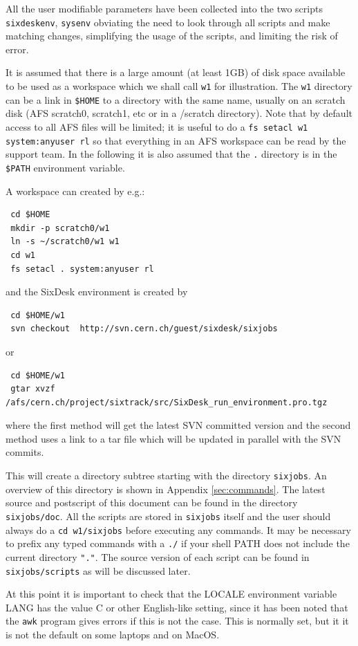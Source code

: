 \documentclass{cernatsnote}
\begin{document}
All the user modifiable parameters have been collected into the two scripts
{\tt sixdeskenv}, {\tt sysenv} obviating the need to look through all scripts
and make matching changes, simplifying the usage of the scripts, and limiting
the risk of error.

It is assumed that there is a large amount (at least 1GB) of disk space
available to be used as a workspace which we shall call {\tt w1} for
illustration. The {\tt w1} directory can be a link in {\tt \$HOME} to a
directory with the same name, usually on an scratch disk (AFS scratch0,
scratch1, etc or in a /scratch directory).  Note that by default access to all
AFS files will be limited; it is useful to do a {\tt fs setacl w1
system:anyuser rl} so that everything in an AFS workspace can be read by the
support team. In the following it is also assumed that the {\tt .} directory is
in the {\tt \$PATH} environment variable.

A workspace can created by e.g.:
\begin{verbatim}
 cd $HOME
 mkdir -p scratch0/w1
 ln -s ~/scratch0/w1 w1 
 cd w1
 fs setacl . system:anyuser rl
\end{verbatim}
and the SixDesk environment is created by
\begin{verbatim}
 cd $HOME/w1
 svn checkout  http://svn.cern.ch/guest/sixdesk/sixjobs
\end{verbatim}
or
\begin{verbatim}
 cd $HOME/w1
 gtar xvzf /afs/cern.ch/project/sixtrack/src/SixDesk_run_environment.pro.tgz
\end{verbatim}
where the first method will get the latest SVN committed version and the second
method uses a link to a tar file which will be updated in parallel with the SVN
commits.

This will create a directory subtree starting with the directory {\tt sixjobs}.
An overview of this directory is shown in Appendix \ref{sec:commands}.  The
latest source and postscript of this document can be found in the directory
{\tt sixjobs/doc}.  All the scripts are stored in {\tt sixjobs} itself and the
user should always do a {\tt cd w1/sixjobs} before executing any commands. It
may be necessary to prefix any typed commands with a {\tt ./} if your shell
PATH does not include the current directory {\tt "."}.  The source version of
each script can be found in {\tt sixjobs/scripts} as will be discussed later.

At this point it is important to check that the LOCALE environment variable
LANG has the value C or other English-like setting, since it has been noted
that the {\tt awk} program gives errors if this is not the case. This is
normally set, but it it is not the default on some laptops and on MacOS.
\end{document}
